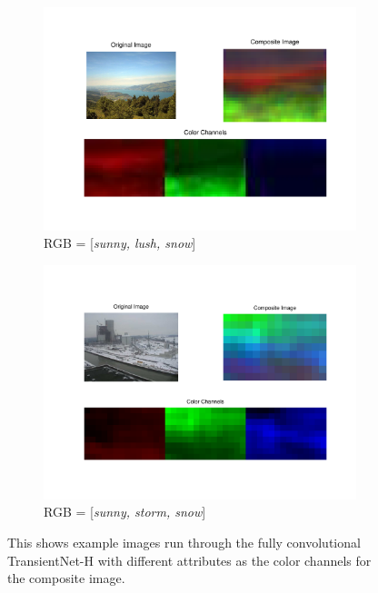 \documentclass[10pt,twocolumn,letterpaper]{article}
\begin{document}
\begin{figure}
  \centering
  \begin{subfigure}[b]{0.49\textwidth}
    \centering
		\includegraphics[width=\textwidth, trim= 15mm 17mm 10mm 10mm]{figs/false_color_7371.pdf}
    \caption{RGB = [\textit{sunny, lush, snow}]}
    \label{fig:false_color_1}
  \end{subfigure}
  \begin{subfigure}[b]{0.49\textwidth}
    \centering
		\includegraphics[width=\textwidth, trim= 15mm 17mm 10mm 10mm]{figs/false_color_82.pdf}
    \caption{RGB = [\textit{sunny, storm, snow}]}
    \label{fig:false_color_2}
  \end{subfigure}
  \caption{This shows example images run through the fully convolutional
           TransientNet-H with different attributes as the color channels for
           the composite image.}
  \label{fig:false_color_ims}
\end{figure}
\end{document}
